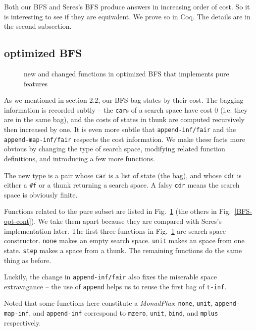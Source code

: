 \documentclass[format=acmlarge, review=true, authordraft=true]{acmart}
\begin{document}
Both our BFS and Seres's BFS \citep{seres1999algebra} produce answers in 
increasing order of cost. So it is interesting to see if they are equivalent. 
We prove so in Coq. The details are in the second subsection.

\subsection{optimized BFS}

\begin{figure}
		
	\caption{new and changed functions in optimized BFS that implements pure 
	features}
	\label{BFS-opt}
\end{figure}

As we mentioned in section 2.2, our BFS bag states by their cost. The bagging 
information is recorded subtly -- the \texttt{car}s of a search space have cost 
0 (i.e. they are in the same bag), and the costs of states in thunk are 
computed recursively then increased by one. It is even more subtle that
\texttt{append-inf/fair} and the \texttt{append-map-inf/fair} respects the cost 
information. We make these facts more obvious by changing the type of search 
space, modifying related function definitions, and introducing a few more 
functions.

The new type is a pair whose \texttt{car} is a list of state (the bag), and 
whose \texttt{cdr} is either a \texttt{\#{}f} or a thunk returning a search 
space. A falsy \texttt{cdr} means the search space is obviously finite. 

Functions related to the pure subset are listed in Fig.~\ref{BFS-opt} (the 
others in Fig.~\ref{BFS-opt-cont}). We take them apart because they are 
compared with Seres's implementation later. The first three functions in 
Fig.~\ref{BFS-opt} are search space constructor. \texttt{none} makes an empty 
search space. \texttt{unit} makes an space from one state. \texttt{step} makes 
a space from a thunk. The remaining functions do the same thing as before. 

Luckily, the change in \texttt{append-inf/fair} also fixes the miserable space 
extravagance -- the use of \texttt{append} helps us to reuse the first bag of 
\texttt{t-inf}.

Noted that some functions here constitute a \emph{MonadPlus}: 
\texttt{none}, \texttt{unit}, \texttt{append-map-inf}, and \texttt{append-inf} 
correspond to \texttt{mzero}, \texttt{unit}, \texttt{bind}, and \texttt{mplus} 
respectively.
\end{document}
